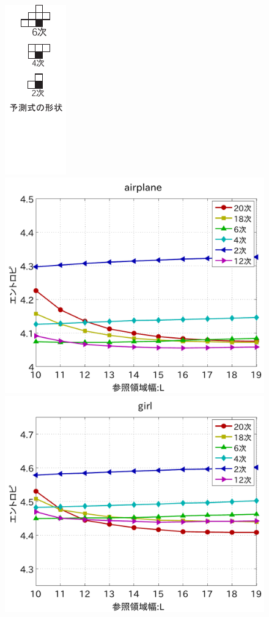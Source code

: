\documentclass[25pt,landscape,dvipdfmx,uplatex]{foils}
\begin{document}
\begin{figure}[b]
\begin{center}
\vspace{3mm}
\includegraphics[scale=2]{fig/yosokusiki2.pdf}
\includegraphics[width=11.5cm]{fig/test1/airplane.pdf}
\includegraphics[width=11.5cm]{fig/test1/girl.pdf}
\end{center}
\end{figure}
\end{document}
